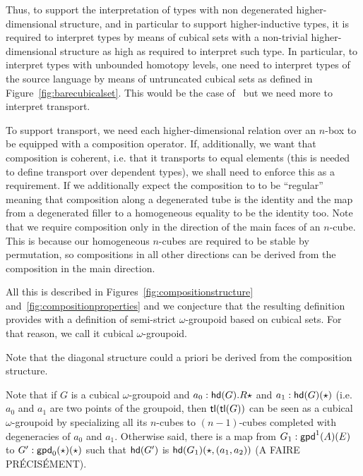 \documentclass{article}
\begin{document}
Thus, to support the interpretation of types with non degenerated
higher-dimensional structure, and in particular to support
higher-inductive types, it is required to interpret types by means of
cubical sets with a non-trivial higher-dimensional structure as high
as required to interpret such type. In particular, to interpret types
with unbounded homotopy levels, one need to interpret types of the
source language by means of untruncated cubical sets as defined in
Figure~\ref{fig:barecubicalset}. This would be the case
of~\cite{BernardyCoquandMoulin15} but we need more to interpret
transport.

To support transport, we need each higher-dimensional relation over an
$n$-box to be equipped with a composition operator. If, additionally,
we want that composition is coherent, i.e. that it transports to equal
elements (this is needed to define transport over dependent types), we
shall need to enforce this as a requirement. If we additionally expect
the composition to to be ``regular'' meaning that composition along a
degenerated tube is the identity and the map from a degenerated filler
to a homogeneous equality to be the identity too. Note that we require
composition only in the direction of the main faces of an
$n$-cube. This is because our homogeneous $n$-cubes are required to be
stable by permutation, so compositions in all other directions can be
derived from the composition in the main direction.

All this is described in Figures~\ref{fig:compositionstructure}
and~\ref{fig:compositionproperties} and we conjecture that the
resulting definition provides with a definition of semi-strict
$\omega$-groupoid based on cubical sets. For that reason, we call it
cubical $\omega$-groupoid.

Note that the diagonal structure could a priori be derived from the
composition structure.

Note that if $G$ is a cubical $\omega$-groupoid and
$a_0:\mathsf{hd}(G).R\star$ and $a_1:\mathsf{hd}(G)(\star)$ (i.e. $a_0$ and $a_1$ are
two points of the groupoid, then $\mathsf{tl}(\mathsf{tl}(G))$ can be seen as a
cubical $\omega$-groupoid by specializing all its $n$-cubes to
$(n-1)$-cubes completed with degeneracies of $a_0$ and
$a_1$. Otherwise said, there is a map from $G_1:\mathsf{gpd}^{1}(A)(E)$ to
$G':\mathsf{gpd}_0(\star)(\star)$ such that $\mathsf{hd}(G')$ is
$\mathsf{hd}(G_1)(\star,(a_1,a_2))$ (A FAIRE PRÉCISÉMENT).
\end{document}
